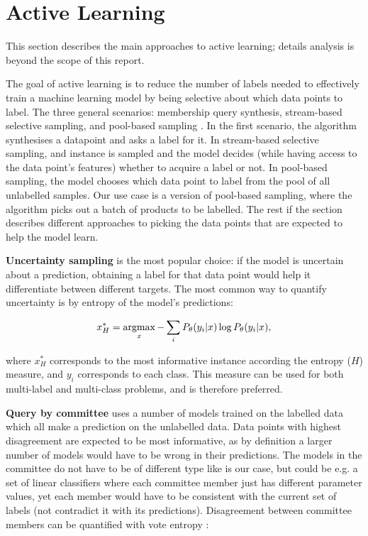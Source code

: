 
\section{Active Learning}
\label{bg_al}

This section describes the main approaches to active learning;  details analysis is beyond the scope of this report.


The goal of active learning is to reduce the number of labels needed  to effectively train a machine learning model by  being selective about which data points to label.
The three general scenarios: membership query synthesis, stream-based selective sampling, and pool-based sampling \cite{al_survey}.
In the first scenario, the algorithm synthesises a datapoint and asks a label for it.
In stream-based selective sampling, and instance is sampled and  the model decides (while having access to the data point's features) whether to acquire a label or not.
In pool-based sampling, the model chooses which data point to label from the pool of all unlabelled samples.
Our use case is a version of pool-based sampling, where the algorithm picks out a batch of products to be labelled.
The rest if the section describes different approaches to picking the data points that are expected to help the model learn.

\textbf{Uncertainty sampling} is the most popular choice: if the model is uncertain about a prediction, obtaining a label for that data point would help it differentiate between different targets.
The most common way to quantify uncertainty is by entropy of the model's predictions:

\begin{equation}
 x^*_H = \operatorname*{argmax}_x - \sum_{i} P_\theta(y_i|x) \log P_\theta(y_i|x),
\end{equation}

where $x^*_H$ corresponds to the most informative instance according the entropy ($H$) measure, and $y_i$ corresponds to each class.
This measure can be used for both multi-label and multi-class problems, and is therefore preferred.

\textbf{Query by committee} uses a number of models trained on the labelled data which all make a prediction on the unlabelled data.
Data points with highest disagreement are expected to be most informative, as by definition a larger number of models would have to be wrong in their predictions.
The models in the committee do not have to be of different type like is our case, but could be e.g. a set of linear classifiers where each committee member just has different parameter values, yet each member would have to be consistent with the current set of labels (not contradict it with its predictions).
Disagreement between committee members can be quantified with vote entropy \cite{vote_entropy}:

